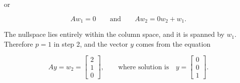 or

\[Aw_{1}=0\qquad\text{and}\qquad Aw_{2}=0w_{2}+w_{1}.\]

The nullspace lies entirely within the column space, and it is spanned by \(w_{1}\). Therefore \(p=1\) in step 2, and the vector \(y\) comes from the equation

\[Ay=w_{2}=\begin{bmatrix}2\\ 1\\ 0\end{bmatrix},\qquad\text{where solution is}\quad y=\begin{bmatrix}0\\ 0\\ 1\end{bmatrix}.\] 
